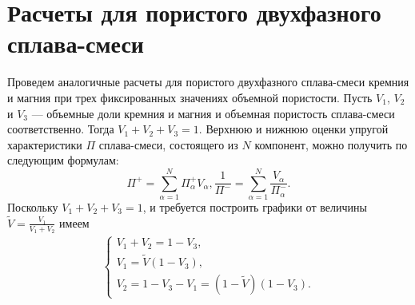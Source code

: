 \documentclass[12pt, a4paper]{article}
\begin{document}
\section{Расчеты для пористого двухфазного сплава-смеси}
Проведем аналогичные расчеты для пористого двухфазного сплава-смеси кремния и магния при трех фиксированных значениях объемной пористости. Пусть $V_1$,
$V_2$ и $V_3$ --- объемные доли кремния и магния и объемная пористость сплава-смеси
соответственно. Тогда $V_1 + V_2 + V_3 = 1$.
Верхнюю и нижнюю оценки упругой характеристики $\Pi$ сплава-смеси, состоящего
из $N$ компонент, можно получить по следующим формулам:
\[
\Pi^{+} = \sum \limits_{\alpha = 1}^{N} {\Pi^{+}_{\alpha} V_{\alpha}},
\frac{1}{\Pi^{-}} = \sum \limits_{\alpha = 1}^{N} {\frac{V_{\alpha}}{\Pi_{\alpha}^{-}}}.
\]
Поскольку $V_1 + V_2 + V_3 = 1$, и требуется построить графики от величины $\tilde{V} = \frac{V_1}{V_1 + V_2}$ имеем
\begin{gather*}
	\begin{cases}
	V_1 + V_2 = 1 - V_3,\\
	V_1 = \tilde{V} (1 - V_3),\\
	V_2 = 1 - V_3 - V_1 = (1 - \tilde{V})(1 - V_3).
\end{cases}
\end{gather*}
\end{document}
